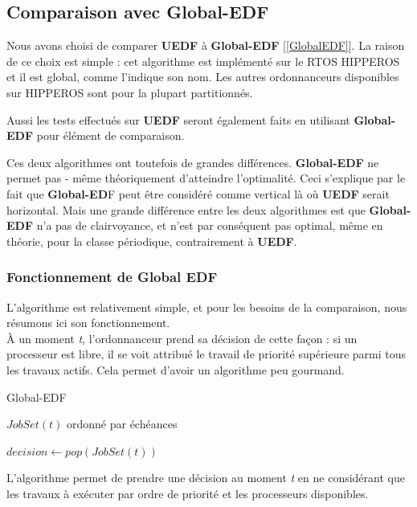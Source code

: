 	
	\subsection{Comparaison avec Global-EDF}
	
	Nous avons choisi de comparer \textbf{UEDF} à \textbf{Global-EDF} [\ref*{GlobalEDF}]. 
	La raison de ce choix est simple : 
	cet algorithme est implémenté sur le RTOS HIPPEROS et il est global, comme 
	l'indique son nom. 
	Les autres ordonnanceurs disponibles sur HIPPEROS sont pour la plupart partitionnés.
 
	Aussi les tests effectués sur \textbf{UEDF} seront également faits en utilisant \textbf{Global-EDF} pour 
	élément de comparaison.\newline
	
	Ces deux algorithmes ont toutefois de grandes différences. \textbf{Global-EDF}
	ne permet pas - même théoriquement  d'atteindre l'optimalité. Ceci s'explique par le fait que 
	\textbf{Global-ED}F peut être considéré comme \og{}vertical\fg{} là où \textbf{UEDF} serait \og{}horizontal\fg{}. 
	Mais une grande différence entre les deux algorithmes est que \textbf{Global-EDF} n'a pas de clairvoyance, 
	et n'est par conséquent pas optimal, même en théorie, pour la classe périodique, 
	contrairement à \textbf{UEDF}.
	
	\subsubsection{Fonctionnement de Global EDF}
	
	L'algorithme est relativement simple, et pour les besoins de la comparaison, nous résumons 
	ici son fonctionnement.\\
	À un moment \textit{t}, l'ordonnanceur prend sa décision de cette façon :
	si un processeur est libre, il se voit attribué le travail de priorité supérieure parmi 
	tous les travaux actifs. Cela permet d'avoir un algorithme peu gourmand.
	
	\begin{algorithm}
	\caption{Global-EDF}
	\begin{algorithmic}
		\REQUIRE $JobSet(t)$ ordonné par échéances
			\item $decision \leftarrow pop(JobSet(t))$
		\ENDFOR
	\end{algorithmic}
\end{algorithm}	
	
	L'algorithme permet de prendre une décision au moment \textit{t} en ne considérant 
	que les travaux à exécuter par ordre de priorité et les processeurs disponibles.
	

